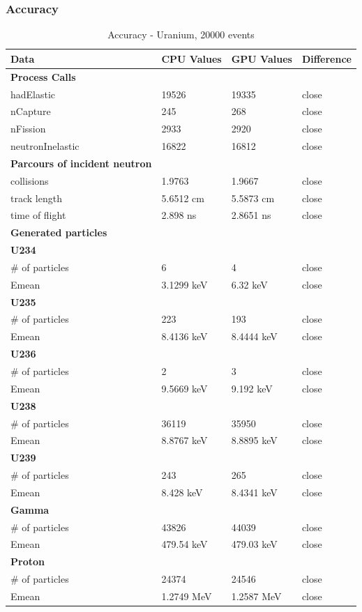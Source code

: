 \documentclass[12pt]{article}
\begin{document}
	\subsubsection{Accuracy}
		\begin{table}[H]
		\centering
		\caption{Accuracy - Uranium, 20000 events}\label{sys5Acc}
		\begin{tabular}{llll}
		\toprule
		\bf Data & CPU Values & GPU Values & Difference\\\midrule
		\bf Process Calls&&&\\
		hadElastic&19526&19335&close\\
		nCapture&245&268&close\\
		nFission&2933&2920&close\\
		neutronInelastic&16822&16812&close\\ 
		
		\midrule
		\bf Parcours of incident neutron&&&\\
		collisions&1.9763&1.9667&close\\
		track length&5.6512 cm&5.5873 cm&close\\
		time of flight&2.898 ns&2.8651 ns&close\\

		\midrule
		\bf Generated particles&&&\\
		\bf{U234}&&&\\
		\# of particles&6&4&close\\
		Emean&3.1299 keV&6.32 keV&close\\
		
		\bf{U235}&&&\\
		\# of particles&223&193&close\\
		Emean&8.4136 keV&8.4444 keV&close\\
		
		\bf{U236}&&&\\
		\# of particles&2&3&close\\
		Emean&9.5669 keV&9.192 keV&close\\
		
		\bf{U238}&&&\\
		\# of particles&36119&35950&close\\
		Emean&8.8767 keV&8.8895 keV&close\\
		
		\bf{U239}&&&\\
		\# of particles&243&265&close\\
		Emean&8.428 keV&8.4341 keV&close\\
		\bf{Gamma}&&&\\
		\# of particles&43826&44039&close\\
		Emean&479.54 keV&479.03 keV&close\\
		\bf{Proton}&&&\\
		\# of particles&24374&24546&close\\
		Emean&1.2749 MeV&1.2587 MeV&close\\\bottomrule
		\end{tabular}
		\end{table}
\end{document}
